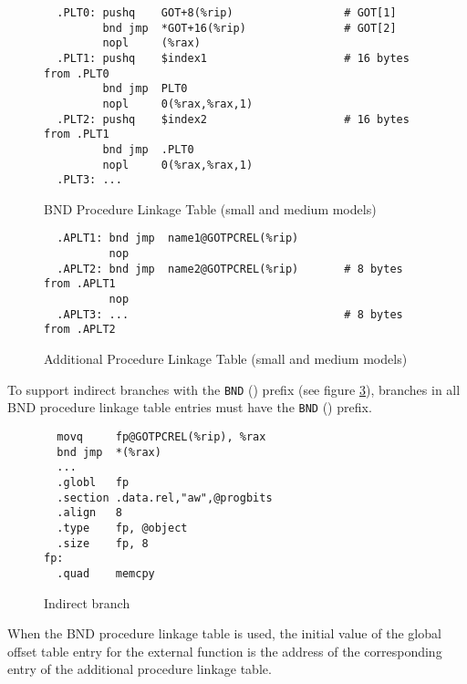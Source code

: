 \begin{figure}[H]
\Hrule
\caption{BND Procedure Linkage Table (small and medium models)}
\label{bnd_small_med_plt}
\begin{footnotesize}
\begin{verbatim}
  .PLT0: pushq    GOT+8(%rip)                 # GOT[1]
         bnd jmp  *GOT+16(%rip)               # GOT[2]
         nopl     (%rax)
  .PLT1: pushq    $index1                     # 16 bytes from .PLT0
         bnd jmp  PLT0
         nopl     0(%rax,%rax,1)
  .PLT2: pushq    $index2                     # 16 bytes from .PLT1
         bnd jmp  .PLT0
         nopl     0(%rax,%rax,1)
  .PLT3: ...
\end{verbatim}%
\end{footnotesize}
\Hrule
\end{figure}

\begin{figure}[H]
\Hrule
\caption{Additional Procedure Linkage Table (small and medium models)}
\label{ext_small_med_plt}
\begin{footnotesize}
\begin{verbatim}
  .APLT1: bnd jmp  name1@GOTPCREL(%rip)
          nop
  .APLT2: bnd jmp  name2@GOTPCREL(%rip)       # 8 bytes from .APLT1
          nop
  .APLT3: ...                                 # 8 bytes from .APLT2
\end{verbatim}%
\end{footnotesize}
\Hrule
\end{figure}

To support indirect branches with the \texttt{BND} () prefix
(see figure \ref{indirect_branch}), branches in all BND procedure linkage
table entries must have the \texttt{BND} () prefix.

\begin{figure}[H]
\Hrule
\caption{Indirect branch}
\label{indirect_branch}
\begin{footnotesize}
\begin{verbatim}
  movq     fp@GOTPCREL(%rip), %rax
  bnd jmp  *(%rax)
  ...
  .globl   fp
  .section .data.rel,"aw",@progbits
  .align   8
  .type    fp, @object
  .size    fp, 8
fp:
  .quad    memcpy
\end{verbatim}%
\end{footnotesize}
\Hrule
\end{figure}

When the BND procedure linkage table is used, the initial value of the
global offset table entry for the external function is the address of the
corresponding entry of the additional procedure linkage table.


